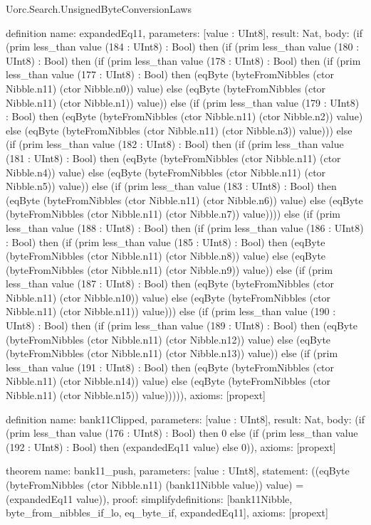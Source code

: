 \begin{lexlean}{Uorc.Search.UnsignedByteConversionLaws}
\begin{semanticmodule}
definition{
  name: expandedEq11,
  parameters: [value : UInt8],
  result: Nat,
  body: (if (prim less_than value (184 : UInt8) : Bool) then (if (prim less_than value (180 : UInt8) : Bool) then (if (prim less_than value (178 : UInt8) : Bool) then (if (prim less_than value (177 : UInt8) : Bool) then (eqByte (byteFromNibbles (ctor Nibble.n11) (ctor Nibble.n0)) value) else (eqByte (byteFromNibbles (ctor Nibble.n11) (ctor Nibble.n1)) value)) else (if (prim less_than value (179 : UInt8) : Bool) then (eqByte (byteFromNibbles (ctor Nibble.n11) (ctor Nibble.n2)) value) else (eqByte (byteFromNibbles (ctor Nibble.n11) (ctor Nibble.n3)) value))) else (if (prim less_than value (182 : UInt8) : Bool) then (if (prim less_than value (181 : UInt8) : Bool) then (eqByte (byteFromNibbles (ctor Nibble.n11) (ctor Nibble.n4)) value) else (eqByte (byteFromNibbles (ctor Nibble.n11) (ctor Nibble.n5)) value)) else (if (prim less_than value (183 : UInt8) : Bool) then (eqByte (byteFromNibbles (ctor Nibble.n11) (ctor Nibble.n6)) value) else (eqByte (byteFromNibbles (ctor Nibble.n11) (ctor Nibble.n7)) value)))) else (if (prim less_than value (188 : UInt8) : Bool) then (if (prim less_than value (186 : UInt8) : Bool) then (if (prim less_than value (185 : UInt8) : Bool) then (eqByte (byteFromNibbles (ctor Nibble.n11) (ctor Nibble.n8)) value) else (eqByte (byteFromNibbles (ctor Nibble.n11) (ctor Nibble.n9)) value)) else (if (prim less_than value (187 : UInt8) : Bool) then (eqByte (byteFromNibbles (ctor Nibble.n11) (ctor Nibble.n10)) value) else (eqByte (byteFromNibbles (ctor Nibble.n11) (ctor Nibble.n11)) value))) else (if (prim less_than value (190 : UInt8) : Bool) then (if (prim less_than value (189 : UInt8) : Bool) then (eqByte (byteFromNibbles (ctor Nibble.n11) (ctor Nibble.n12)) value) else (eqByte (byteFromNibbles (ctor Nibble.n11) (ctor Nibble.n13)) value)) else (if (prim less_than value (191 : UInt8) : Bool) then (eqByte (byteFromNibbles (ctor Nibble.n11) (ctor Nibble.n14)) value) else (eqByte (byteFromNibbles (ctor Nibble.n11) (ctor Nibble.n15)) value))))),
  axioms: [propext]
}

definition{
  name: bank11Clipped,
  parameters: [value : UInt8],
  result: Nat,
  body: (if (prim less_than value (176 : UInt8) : Bool) then 0 else (if (prim less_than value (192 : UInt8) : Bool) then (expandedEq11 value) else 0)),
  axioms: [propext]
}

theorem{
  name: bank11_push,
  parameters: [value : UInt8],
  statement: ((eqByte (byteFromNibbles (ctor Nibble.n11) (bank11Nibble value)) value) = (expandedEq11 value)),
  proof: simplify{definitions: [bank11Nibble, byte_from_nibbles_if_lo, eq_byte_if, expandedEq11]},
  axioms: [propext]
}


\end{semanticmodule}
\end{lexlean}

